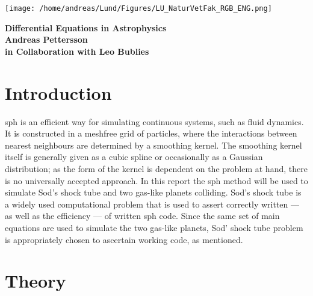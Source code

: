 \documentclass[12pt]{article}
\begin{document}
	
\begin{titlepage}
	\begin{center}
		\texttt{[image: /home/andreas/Lund/Figures/LU\_NaturVetFak\_RGB\_ENG.png]}
		\vspace{5cm}
		
		{\Huge{\bf Differential Equations in Astrophysics}}\\
		\vspace{1cm}
		{\Large{\bf Andreas Pettersson}}\\
		\vspace{5mm}
		{\Large{\bf in Collaboration with Leo Bublies}}
		
	\end{center}
\end{titlepage}
	


\newpage
\printnoidxglossary[type=abbreviations,style=list,title={List of Abbreviations}]

\newpage
\tableofcontents
\newpage
\setcounter{page}{1}

\section{Introduction}

\gls{sph} is an efficient way for simulating continuous systems, such as fluid dynamics. It is constructed in a meshfree grid of particles, where the interactions between nearest neighbours are determined by a smoothing kernel. The smoothing kernel itself is generally given as a cubic spline or occasionally as a Gaussian distribution; as the form of the kernel is dependent on the problem at hand, there is no universally accepted approach.\newline 
In this report the \gls{sph} method will be used to simulate Sod's shock tube and two gas-like planets colliding.\newline
Sod's shock tube is a widely used computational problem that is used to assert correctly written --- as well as the efficiency --- of written \gls{sph} code. Since the same set of main equations are used to simulate the two gas-like planets, Sod' shock tube problem is appropriately chosen to ascertain working code, as mentioned. 

\section{Theory}
\end{document}
